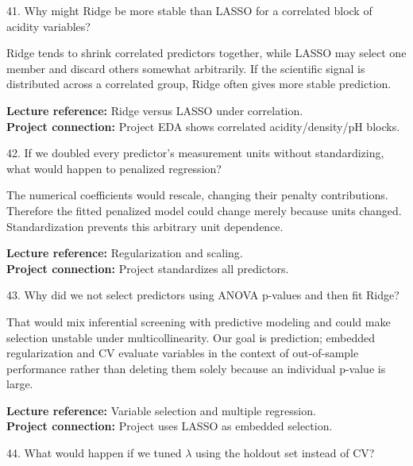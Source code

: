 \documentclass[10.5pt,a4paper]{article}
\newcommand{\chapref}[1]{\textbf{Lecture reference:} #1}
\newcommand{\projectref}[1]{\textbf{Project connection:} #1}
\begin{document}
\begin{qbox}{41. Why might Ridge be more stable than LASSO for a correlated block of acidity variables?}
\end{qbox}
\begin{answerbox}Ridge tends to shrink correlated predictors together, while LASSO may select one member and discard others somewhat arbitrarily. If the scientific signal is distributed across a correlated group, Ridge often gives more stable prediction.\end{answerbox}
\begin{refbox}\chapref{Ridge versus LASSO under correlation.}\\\projectref{Project EDA shows correlated acidity/density/pH blocks.}\end{refbox}
\begin{qbox}{42. If we doubled every predictor's measurement units without standardizing, what would happen to penalized regression?}
\end{qbox}
\begin{answerbox}The numerical coefficients would rescale, changing their penalty contributions. Therefore the fitted penalized model could change merely because units changed. Standardization prevents this arbitrary unit dependence.\end{answerbox}
\begin{refbox}\chapref{Regularization and scaling.}\\\projectref{Project standardizes all predictors.}\end{refbox}
\begin{qbox}{43. Why did we not select predictors using ANOVA p-values and then fit Ridge?}
\end{qbox}
\begin{answerbox}That would mix inferential screening with predictive modeling and could make selection unstable under multicollinearity. Our goal is prediction; embedded regularization and CV evaluate variables in the context of out-of-sample performance rather than deleting them solely because an individual p-value is large.\end{answerbox}
\begin{refbox}\chapref{Variable selection and multiple regression.}\\\projectref{Project uses LASSO as embedded selection.}\end{refbox}
\begin{qbox}{44. What would happen if we tuned $\lambda$ using the holdout set instead of CV?}
\end{qbox}
\end{document}
